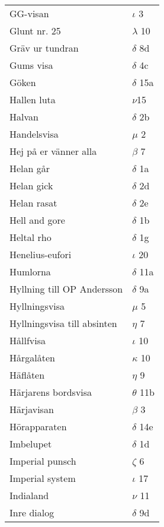 \documentclass[a6paper,10pt]{article}
\begin{document}
\newpage
\begin{table}[!h]
\begin{tabular}{l l}
GG-visan&$\iota$ 3\\
Glunt nr. 25&$\lambda$ 10\\
Gräv ur tundran&$\delta$ 8d\\
Gums visa&$\delta$ 4c\\
Göken&$\delta$ 15a\\
Hallen luta&$\nu$15\\
Halvan&$\delta$ 2b\\
Handelsvisa&$\mu$ 2\\
Hej på er vänner alla&$\beta$ 7\\
Helan går&$\delta$ 1a\\
Helan gick&$\delta$ 2d\\
Helan rasat&$\delta$ 2e\\
Hell and gore&$\delta$ 1b\\
Heltal rho&$\delta$ 1g\\
Henelius-eufori&$\iota$ 20\\
Humlorna&$\delta$ 11a\\
Hyllning till OP Andersson&$\delta$ 9a\\
Hyllningsvisa&$\mu$ 5\\
Hyllningsvisa till absinten&$\eta$ 7\\
Hållfvisa&$\iota$ 10\\
Hårgalåten&$\kappa$ 10\\
Häflåten&$\eta$ 9\\
Härjarens bordsvisa&$\theta$ 11b\\
Härjavisan&$\beta$ 3\\
Hörapparaten&$\delta$ 14e\\
Imbelupet&$\delta$ 1d\\
Imperial punsch&$\zeta$ 6\\
Imperial system&$\iota$ 17\\
Indialand&$\nu$ 11\\
Inre dialog&$\delta$ 9d\\
\end{tabular}
\end{table}
\end{document}
